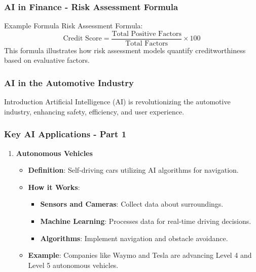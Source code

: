 \documentclass{beamer}
\begin{document}
\begin{frame}[fragile]
    \frametitle{AI in Finance - Risk Assessment Formula}
    \begin{block}{Example Formula}
        Risk Assessment Formula: 
        \begin{equation}
            \text{Credit Score} = \frac{\text{Total Positive Factors}}{\text{Total Factors}} \times 100
        \end{equation}
        This formula illustrates how risk assessment models quantify creditworthiness based on evaluative factors.
    \end{block}
\end{frame}

\begin{frame}[fragile]
    \frametitle{AI in the Automotive Industry}
    \begin{block}{Introduction}
        Artificial Intelligence (AI) is revolutionizing the automotive industry, enhancing safety, efficiency, and user experience.
    \end{block}
\end{frame}

\begin{frame}[fragile]
    \frametitle{Key AI Applications - Part 1}
    \begin{enumerate}
        \item \textbf{Autonomous Vehicles}
            \begin{itemize}
                \item \textbf{Definition}: Self-driving cars utilizing AI algorithms for navigation.
                \item \textbf{How it Works}: 
                    \begin{itemize}
                        \item \textbf{Sensors and Cameras}: Collect data about surroundings.
                        \item \textbf{Machine Learning}: Processes data for real-time driving decisions.
                        \item \textbf{Algorithms}: Implement navigation and obstacle avoidance.
                    \end{itemize}
                \item \textbf{Example}: Companies like Waymo and Tesla are advancing Level 4 and Level 5 autonomous vehicles.
            \end{itemize}
    \end{enumerate}
\end{frame}
\end{document}
